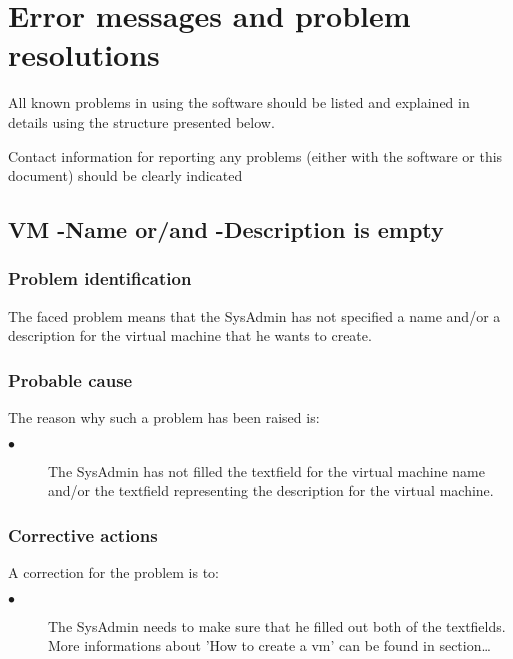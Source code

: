 
\chapter{Error messages and problem resolutions}
\label{chap:error_messages}

All known problems in using the software should be listed and explained in
details using the structure presented below.

Contact information for reporting any problems (either with the software or
this document) should be clearly indicated




\section{VM -Name or/and -Description is empty} 

\subsection{Problem identification}
The faced problem means that the SysAdmin has not specified a name and/or a
description for the virtual machine that he wants to create.

\subsection{Probable cause}

The reason why such a problem has been raised is:\\
\begin{description}
\item[$\bullet$] The SysAdmin has not filled the textfield for the virtual
machine name and/or the textfield representing the description for the virtual
machine.
\end{description}


\subsection{Corrective actions}

A correction for the problem is to:\\
\begin{description}
\item[$\bullet$] The SysAdmin needs to make sure that he filled out both of
the textfields.  More informations about 'How to create a vm' can be found in
section\ldots

\end{description}







